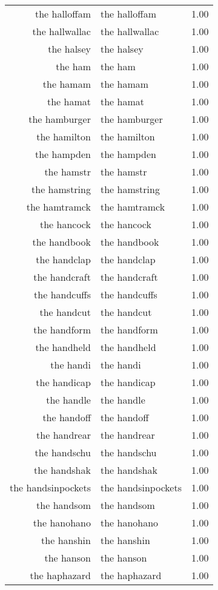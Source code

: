 \begin{table}[ht]
\begin{tabular}{rlr}
  the halloffam & the halloffam & 1.00 \\ 
  the hallwallac & the hallwallac & 1.00 \\ 
  the halsey & the halsey & 1.00 \\ 
  the ham & the ham & 1.00 \\ 
  the hamam & the hamam & 1.00 \\ 
  the hamat & the hamat & 1.00 \\ 
  the hamburger & the hamburger & 1.00 \\ 
  the hamilton & the hamilton & 1.00 \\ 
  the hampden & the hampden & 1.00 \\ 
  the hamstr & the hamstr & 1.00 \\ 
  the hamstring & the hamstring & 1.00 \\ 
  the hamtramck & the hamtramck & 1.00 \\ 
  the hancock & the hancock & 1.00 \\ 
  the handbook & the handbook & 1.00 \\ 
  the handclap & the handclap & 1.00 \\ 
  the handcraft & the handcraft & 1.00 \\ 
  the handcuffs & the handcuffs & 1.00 \\ 
  the handcut & the handcut & 1.00 \\ 
  the handform & the handform & 1.00 \\ 
  the handheld & the handheld & 1.00 \\ 
  the handi & the handi & 1.00 \\ 
  the handicap & the handicap & 1.00 \\ 
  the handle & the handle & 1.00 \\ 
  the handoff & the handoff & 1.00 \\ 
  the handrear & the handrear & 1.00 \\ 
  the handschu & the handschu & 1.00 \\ 
  the handshak & the handshak & 1.00 \\ 
  the handsinpockets & the handsinpockets & 1.00 \\ 
  the handsom & the handsom & 1.00 \\ 
  the hanohano & the hanohano & 1.00 \\ 
  the hanshin & the hanshin & 1.00 \\ 
  the hanson & the hanson & 1.00 \\ 
  the haphazard & the haphazard & 1.00 \\ 

\end{tabular}
\end{table}
